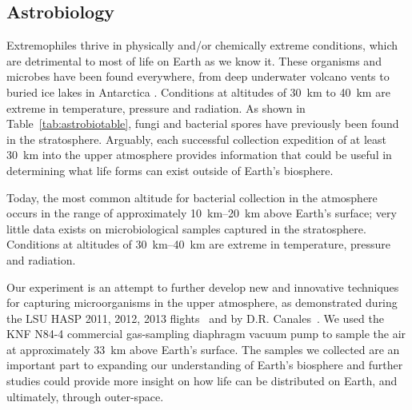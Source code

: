 \subsection{Astrobiology}
\label{sec:Astrobiology-Background}

Extremophiles thrive in physically and/or chemically extreme conditions, which are detrimental to most of life on Earth as we know it. These organisms and microbes have been found everywhere, from deep underwater volcano vents to buried ice lakes in Antarctica \cite{Extremophiles}. Conditions at altitudes of \SI{30}{\kilo\meter} to \SI{40}{\kilo\meter} are extreme in temperature, pressure and radiation. As shown in Table~\ref{tab:astrobiotable}, fungi and bacterial spores have previously been found in the stratosphere. Arguably, each successful collection expedition of at least \SI{30}{\kilo\meter} into the upper atmosphere provides information that could be useful in determining what life forms can exist outside of Earth's biosphere. 
	

Today, the most common altitude for bacterial collection in the atmosphere occurs in the range of approximately \SIrange{10}{20}{\kilo\meter} above Earth's surface; very little data exists on microbiological samples captured in the stratosphere. Conditions at altitudes of \SIrange{30}{40}{\kilo\meter} are extreme in temperature, pressure and radiation. 



Our experiment is an attempt to further develop new and innovative techniques for capturing microorganisms in the upper atmosphere, as demonstrated during the LSU HASP 2011, 2012, 2013 flights~\cite{LSU} and by D.R. Canales~\cite{canales}. We used the KNF N84-4 commercial gas-sampling diaphragm vacuum pump to sample the air at approximately \SI{33}{\kilo\meter} above Earth's surface. The samples we collected are an important part to expanding our understanding of Earth's biosphere and further studies could provide more insight on how life can be distributed on Earth, and ultimately, through outer-space.


